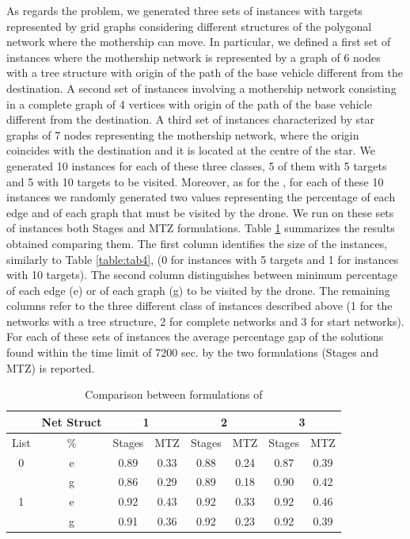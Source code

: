 \noindent
As regards the \NMD \xspace problem, we generated three sets of instances with targets represented by grid graphs considering different structures of the polygonal network where the mothership can move.
In particular, we defined a first set of instances where the mothership network is represented by a graph of 6 nodes with a tree structure with origin of the path of the base vehicle different from the destination.
A second set of instances involving a mothership network consisting in a complete graph of 4 vertices with origin of the path of the base vehicle different from the destination.  
A third set of instances characterized by star graphs of 7 nodes representing the mothership network, where the origin coincides with the destination and it is located at the centre of the star. We generated 10 instances for each of these three classes, 5 of them with 5 targets and 5 with 10 targets to be visited. 
Moreover, as for the \AMD\xspace, for each of these 10 instances we randomly generated two values representing the percentage of each edge and of each graph that must be visited by the drone.
We run on these sets of instances both Stages and MTZ formulations. Table \ref{table:tab5} summarizes the results obtained comparing them. The first column identifies the size of the instances, similarly to Table \ref{table:tab4}, (0 for instances with 5 targets and 1 for instances with 10 targets).
The second column distinguishes between minimum percentage of each edge (e) or of each graph (g) to be visited by the drone.
The remaining columns refer to the three different class  of instances described above (1 for the networks with a tree structure, 2 for complete networks and 3 for start networks).
For each of these sets of instances the average percentage gap of the solutions found within the time limit of 7200 sec. by the two formulations (Stages and MTZ) is reported.


\renewcommand{\arraystretch}{0.7}
\begin{table}[!h]
\caption{Comparison between formulations of \NMD}
\centering
\footnotesize
\begin{tabular}{c c | c c | c c | c c}
\hline
 & Net Struct  & \multicolumn{2}{c}{1} &  \multicolumn{2}{c}{2}  & \multicolumn{2}{c}{3}\\
\hline
List & $\%$ &  Stages  & MTZ & Stages & MTZ  & Stages & MTZ\\
\hline
\multirow{}{}{0} & e & 0.89 & 0.33 & 0.88 & 0.24 & 0.87 & 0.39\\
& g & 0.86 & 0.29 & 0.89 & 0.18 & 0.90 & 0.42\\
\hline
\multirow{}{}{1} & e & 0.92 & 0.43 & 0.92 & 0.33 & 0.92 & 0.46\\
& g & 0.91 & 0.36 & 0.92 & 0.23 & 0.92 & 0.39\\
\hline
\end{tabular}
\label{table:tab5}
\end{table}

